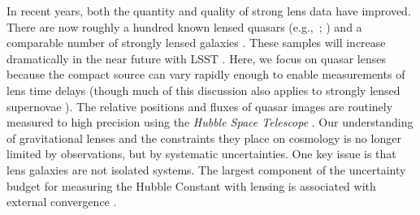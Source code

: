 In recent years, both the quantity and quality of strong lens data have improved. There are now roughly a hundred known lensed quasars \citep[e.g.,\ ;][]{SQLS,CLASS}(e.g.,\ ; \citealt{SQLS,CLASS}) and a comparable number of strongly lensed galaxies \citep[e.g.,][]{Bolton08,Cassowary}. These samples will increase dramatically in the near future with LSST \citep[e.g.,][]{LSST, Coe09, Oguri10, Collett15}. Here, we focus on quasar lenses because the compact source can vary rapidly enough to enable measurements of lens time delays (though much of this discussion also applies to strongly lensed supernovae \citealt{Kelly15}). The relative positions and fluxes of quasar images are routinely measured to high precision using the \textit{Hubble Space Telescope} \citep[e.g,.][and references therein; CASTLeS Collaboration]{Lehar00,Sluse12}. Our understanding of gravitational lenses and the constraints they place on cosmology is no longer limited by observations, but by systematic uncertainties. One key issue is that lens galaxies are not isolated systems. The largest component of the uncertainty budget for measuring the Hubble Constant with lensing is associated with external convergence \citep{Suyu12}.
  